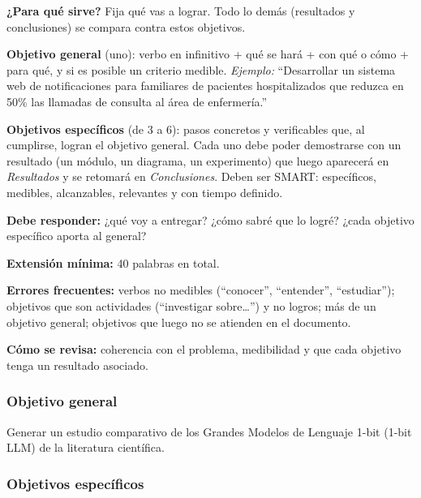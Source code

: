 \begin{guia}
\textbf{¿Para qué sirve?} Fija qué vas a lograr. Todo lo demás (resultados y conclusiones) se compara contra estos objetivos.

\textbf{Objetivo general} (uno): verbo en infinitivo + qué se hará + con qué o cómo + para qué, y si es posible un criterio
medible. \emph{Ejemplo:} ``Desarrollar un sistema web de notificaciones para familiares de pacientes hospitalizados que
reduzca en 50\% las llamadas de consulta al área de enfermería.''

\textbf{Objetivos específicos} (de 3 a 6): pasos concretos y verificables que, al cumplirse, logran el objetivo general.
Cada uno debe poder demostrarse con un resultado (un módulo, un diagrama, un experimento) que luego aparecerá en
\emph{Resultados} y se retomará en \emph{Conclusiones}. Deben ser SMART: específicos, medibles, alcanzables, relevantes y
con tiempo definido.

\textbf{Debe responder:} ¿qué voy a entregar? ¿cómo sabré que lo logré? ¿cada objetivo específico aporta al general?

\textbf{Extensión mínima:} 40 palabras en total.

\textbf{Errores frecuentes:} verbos no medibles (``conocer'', ``entender'', ``estudiar''); objetivos que son actividades
(``investigar sobre\ldots'') y no logros; más de un objetivo general; objetivos que luego no se atienden en el documento.

\textbf{Cómo se revisa:} coherencia con el problema, medibilidad y que cada objetivo tenga un resultado asociado.
\end{guia}

\subsubsection{Objetivo general} \label{subsec:objetivo_general}

Generar un estudio comparativo de los Grandes Modelos de Lenguaje 1-bit (1-bit LLM) de la literatura científica.

\subsubsection{Objetivos específicos} \label{subsec:objetivos_especificos}

